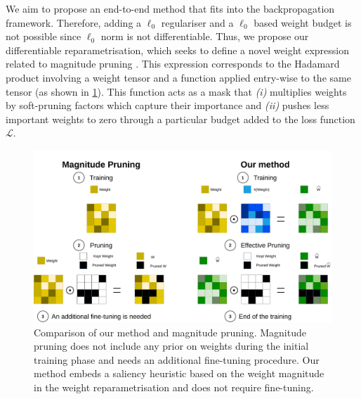 We aim to propose an end-to-end method that fits into the backpropagation
framework. Therefore, adding a $\ell_0$ regulariser and a $\ell_0$ based weight budget
is not possible since $\ell_0$ norm is not differentiable. Thus, we propose our
differentiable reparametrisation, which seeks to define a novel weight
expression related to magnitude pruning
\cite{DBLP:conf/nips/CunDS89,DBLP:conf/nips/HanPTD15}. This expression
corresponds to the Hadamard product involving a weight tensor and a function
applied entry-wise to the same tensor (as shown in
\cref{fig:chap1:comparison_reparam_vs_mag_pruning}). This function acts as a
mask that \emph{(i)} multiplies weights by soft-pruning factors which capture their
importance and \emph{(ii)} pushes less important weights to zero through a particular
budget added to the loss function $\mathcal{L}$. \\

\begin{figure}[ht]
    \centerline{\includegraphics[width=12.5cm]{chapter_1/assets/comparison_reparam_vs_mag_pruning.pdf}}
  \caption{Comparison of our method and magnitude pruning. Magnitude pruning
  does not include any prior on weights during the initial training phase
  and needs an additional fine-tuning procedure. Our method embeds a saliency
  heuristic based on the weight magnitude in the weight reparametrisation and
  does not require fine-tuning.}
  \label{fig:chap1:comparison_reparam_vs_mag_pruning}
\end{figure}



